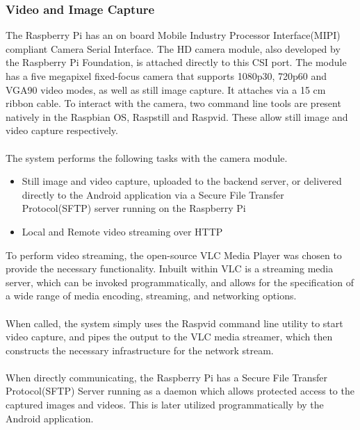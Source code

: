 \documentclass{article}
\begin{document}
\subsubsection{Video and Image Capture}
The Raspberry Pi has an on board Mobile Industry Processor Interface(MIPI) compliant Camera Serial Interface. The HD camera module, also developed by the Raspberry Pi Foundation, is attached directly to this CSI port. The module has a five megapixel fixed-focus camera that supports 1080p30, 720p60 and VGA90 video modes, as well as still image capture. It attaches via a 15 cm ribbon cable. To interact with the camera, two command line tools are present natively in the Raspbian OS, Raspstill and Raspvid. These allow still image and video capture respectively. \\\\
The system performs the following tasks with the camera module.
\begin{itemize}
  \item Still image and video capture, uploaded to the backend server, or delivered 	directly to the Android application via a Secure File Transfer Protocol(SFTP) server running on the Raspberry Pi
  \item Local and Remote video streaming over HTTP
\end{itemize}
To perform video streaming, the open-source VLC Media Player was chosen to provide the necessary functionality. Inbuilt within VLC is a streaming media server, which can be invoked programmatically, and allows for the specification of a wide range of media encoding, streaming, and networking options.\\\\
When called, the system simply uses the Raspvid command line utility to start video capture, and pipes the output to the VLC media streamer, which then constructs the necessary infrastructure for the network stream. \\\\
When directly communicating, the Raspberry Pi has a Secure File Transfer Protocol(SFTP) Server running as a daemon which allows protected access to the captured images and videos. This is later utilized programmatically by the Android application.
\end{document}
